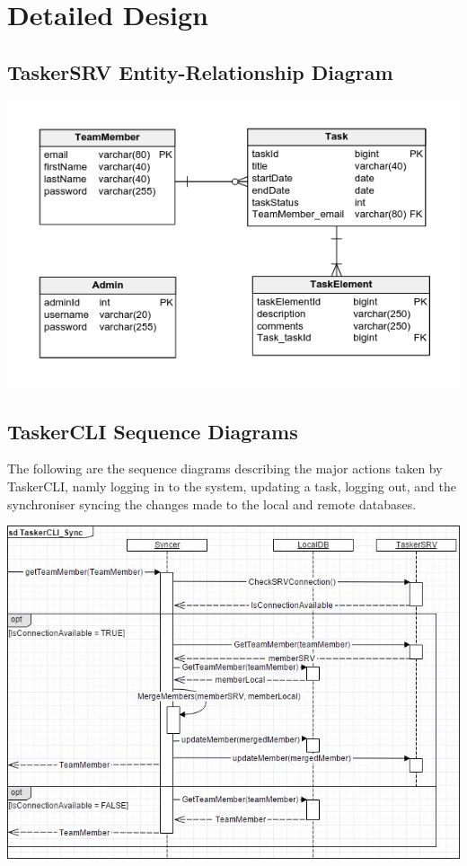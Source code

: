 \documentclass{project}
\begin{document}
\section{Detailed Design}
\subsection{TaskerSRV Entity-Relationship Diagram}
\includegraphics[width=1\textwidth, center]{images/Detailed-Design/taskerSRV} 

\subsection{TaskerCLI Sequence Diagrams}
The following are the sequence diagrams describing the major actions taken by TaskerCLI, namly logging in to the system, updating
a task, logging out, and the synchroniser syncing the changes made to the local and remote databases.

\includegraphics[width=1\textwidth, center]{images/Detailed-Design/TaskerCLISequenceSync} 
\end{document}
